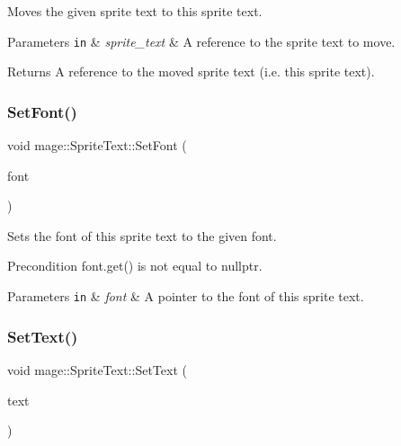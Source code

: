 Moves the given sprite text to this sprite text.


\begin{DoxyParams}[1]{Parameters}
\mbox{\tt in}  & {\em sprite\+\_\+text} & A reference to the sprite text to move. \\
\hline
\end{DoxyParams}
\begin{DoxyReturn}{Returns}
A reference to the moved sprite text (i.\+e. this sprite text). 
\end{DoxyReturn}
\hypertarget{classmage_1_1_sprite_text_a8e753dcd210b1fdf9c5399a9f0f3415d}{}\label{classmage_1_1_sprite_text_a8e753dcd210b1fdf9c5399a9f0f3415d} 
\subsubsection{\texorpdfstring{Set\+Font()}{SetFont()}}
{\footnotesize\ttfamily void mage\+::\+Sprite\+Text\+::\+Set\+Font (\begin{DoxyParamCaption}\item[{\hyperlink{namespacemage_a1e01ae66713838a7a67d30e44c67703e}{Shared\+Ptr}$<$ \hyperlink{classmage_1_1_sprite_font}{Sprite\+Font} $>$}]{font }\end{DoxyParamCaption})}

Sets the font of this sprite text to the given font.

\begin{DoxyPrecond}{Precondition}
{\ttfamily font.\+get()} is not equal to {\ttfamily nullptr}. 
\end{DoxyPrecond}

\begin{DoxyParams}[1]{Parameters}
\mbox{\tt in}  & {\em font} & A pointer to the font of this sprite text. \\
\hline
\end{DoxyParams}
\hypertarget{classmage_1_1_sprite_text_ac33e512ab29554a306ada9a378ab00eb}{}\label{classmage_1_1_sprite_text_ac33e512ab29554a306ada9a378ab00eb} 
\subsubsection{\texorpdfstring{Set\+Text()}{SetText()}\hspace{0.1cm}{\footnotesize\ttfamily [1/3]}}
{\footnotesize\ttfamily void mage\+::\+Sprite\+Text\+::\+Set\+Text (\begin{DoxyParamCaption}\item[{const wstring \&}]{text }\end{DoxyParamCaption})}

